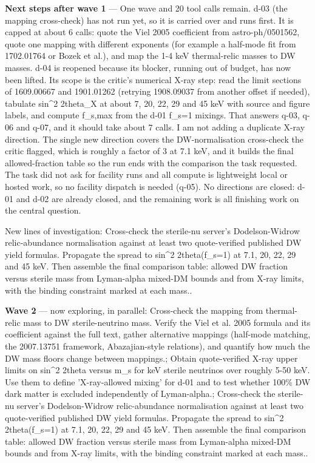 \documentclass[11pt,a4paper]{article}
\begin{document}
\textbf{Next steps after wave 1} --- One wave and 20 tool calls remain. d-03 (the mapping cross-check) has not run yet, so it is carried over and runs first. It is capped at about 6 calls: quote the Viel 2005 coefficient from astro-ph/0501562, quote one mapping with different exponents (for example a half-mode fit from 1702.01764 or Bozek et al.), and map the 1-4 keV thermal-relic masses to DW masses. d-04 is reopened because its blocker, running out of budget, has now been lifted. Its scope is the critic's numerical X-ray step: read the limit sections of 1609.00667 and 1901.01262 (retrying 1908.09037 from another offset if needed), tabulate sin\textasciicircum{}2 2theta\_X at about 7, 20, 22, 29 and 45 keV with source and figure labels, and compute f\_s,max from the d-01 f\_s=1 mixings. That answers q-03, q-06 and q-07, and it should take about 7 calls. I am not adding a duplicate X-ray direction. The single new direction covers the DW-normalisation cross-check the critic flagged, which is roughly a factor of 3 at 7.1 keV, and it builds the final allowed-fraction table so the run ends with the comparison the task requested. The task did not ask for facility runs and all compute is lightweight local or hosted work, so no facility dispatch is needed (q-05). No directions are closed: d-01 and d-02 are already closed, and the remaining work is all finishing work on the central question.

New lines of investigation: Cross-check the sterile-nu server's Dodelson-Widrow relic-abundance normalisation against at least two quote-verified published DW yield formulas. Propagate the spread to sin\textasciicircum{}2 2theta(f\_s=1) at 7.1, 20, 22, 29 and 45 keV. Then assemble the final comparison table: allowed DW fraction versus sterile mass from Lyman-alpha mixed-DM bounds and from X-ray limits, with the binding constraint marked at each mass..

\textbf{Wave 2} --- now exploring, in parallel: Cross-check the mapping from thermal-relic mass to DW sterile-neutrino mass. Verify the Viel et al. 2005 formula and its coefficient against the full text, gather alternative mappings (half-mode matching, the 2007.13751 framework, Abazajian-style relations), and quantify how much the DW mass floors change between mappings.; Obtain quote-verified X-ray upper limits on sin\textasciicircum{}2 2theta versus m\_s for keV sterile neutrinos over roughly 5-50 keV. Use them to define 'X-ray-allowed mixing' for d-01 and to test whether 100\% DW dark matter is excluded independently of Lyman-alpha.; Cross-check the sterile-nu server's Dodelson-Widrow relic-abundance normalisation against at least two quote-verified published DW yield formulas. Propagate the spread to sin\textasciicircum{}2 2theta(f\_s=1) at 7.1, 20, 22, 29 and 45 keV. Then assemble the final comparison table: allowed DW fraction versus sterile mass from Lyman-alpha mixed-DM bounds and from X-ray limits, with the binding constraint marked at each mass..
\end{document}
